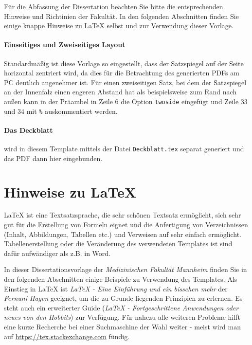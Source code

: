 \documentclass{scrreprt}
\begin{document}
Für die Abfassung der Dissertation beachten Sie bitte die entsprechenden Hinweise und Richtinien der Fakultät. In den folgenden Abschnitten finden Sie einige knappe Hinweise zu LaTeX selbst und zur Verwendung dieser Vorlage. 

\paragraph{Einseitiges und Zweiseitiges Layout}
Standardmäßig ist diese Vorlage so eingestellt, dass der Satzspiegel auf der Seite horizontal zentriert wird, da dies für die Betrachtung des generierten PDFs am PC deutlich angenehmer ist. Für einen zweiseitigen Satz, bei dem der Satzspiegel an der Innenfalz einen engeren Abstand hat als beispielsweise zum Rand nach außen kann in der Präambel in Zeile 6 die Option \verb|twoside| eingefügt und Zeile 33 und 34 mit \verb|%| auskommentiert werden. 

\paragraph{Das Deckblatt} wird in diesem Template mittels der Datei \verb|Deckblatt.tex| separat generiert und das PDF dann hier eingebunden. 

\section{Hinweise zu \LaTeX}
\par{\LaTeX} ist eine Textsatzsprache, die sehr schönen Textsatz ermöglicht, sich sehr gut für die Erstellung von Formeln eignet und die Anfertigung von Verzeichnissen (Inhalt, Abbildungen, Tabellen etc.) und Verweisen auf sehr einfach ermöglicht. Tabellenerstellung oder die Veränderung des verwendeten Templates ist sind dafür aufwändiger als z.B. in Word. 

In dieser Dissertationsvorlage der \textit{Medizinischen Fakultät Mannheim} finden Sie in den folgenden Abschnitten einige Beispiele zu Verwendung des Templates. Als Einstieg in LaTeX  ist  \textit{LaTeX - Eine Einführung und ein bisschen mehr} \cite{LaTeX_Guide_1} der \textit{Fernuni Hagen} geeignet, um die zu Grunde liegenden Prinzipien zu erlernen. Es steht auch ein erweiterter Guide (\textit{LaTeX - Fortgeschrittene Anwendungen oder neues von den Hobbits}) \cite{LaTeX_Guide_2} zur Verfügung. Für nahezu alle weiteren Probleme hilft eine kurze Recherche bei einer Suchmaschine der Wahl weiter - meist wird man auf \url{https://tex.stackexchange.com} fündig. 
\end{document}
